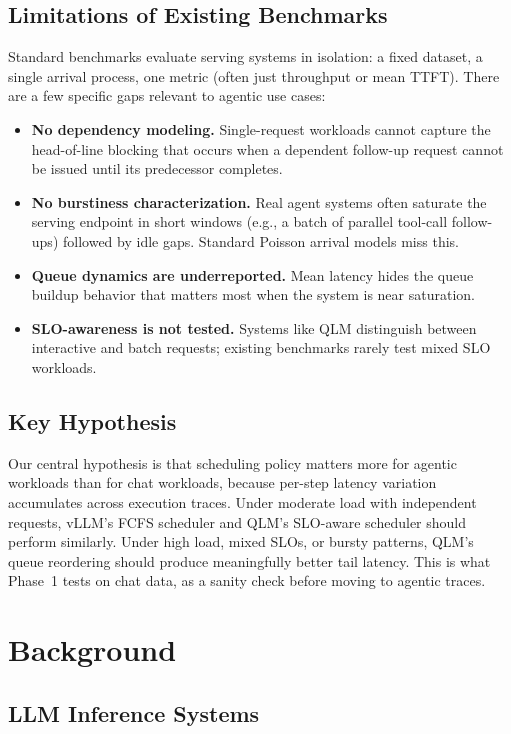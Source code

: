 \documentclass[10pt, twocolumn, letterpaper]{article}
\begin{document}
\subsection{Limitations of Existing Benchmarks}

Standard benchmarks evaluate serving systems in isolation: a fixed dataset, a single arrival process, one metric (often just throughput or mean TTFT). There are a few specific gaps relevant to agentic use cases:

\begin{itemize}
    \item \textbf{No dependency modeling.} Single-request workloads cannot capture the head-of-line blocking that occurs when a dependent follow-up request cannot be issued until its predecessor completes.
    \item \textbf{No burstiness characterization.} Real agent systems often saturate the serving endpoint in short windows (e.g., a batch of parallel tool-call follow-ups) followed by idle gaps. Standard Poisson arrival models miss this.
    \item \textbf{Queue dynamics are underreported.} Mean latency hides the queue buildup behavior that matters most when the system is near saturation.
    \item \textbf{SLO-awareness is not tested.} Systems like QLM distinguish between interactive and batch requests; existing benchmarks rarely test mixed SLO workloads.
\end{itemize}

\subsection{Key Hypothesis}

Our central hypothesis is that scheduling policy matters more for agentic workloads than for chat workloads, because per-step latency variation accumulates across execution traces. Under moderate load with independent requests, vLLM's FCFS scheduler and QLM's SLO-aware scheduler should perform similarly. Under high load, mixed SLOs, or bursty patterns, QLM's queue reordering should produce meaningfully better tail latency. This is what Phase~1 tests on chat data, as a sanity check before moving to agentic traces.

\section{Background}

\subsection{LLM Inference Systems}
\end{document}
